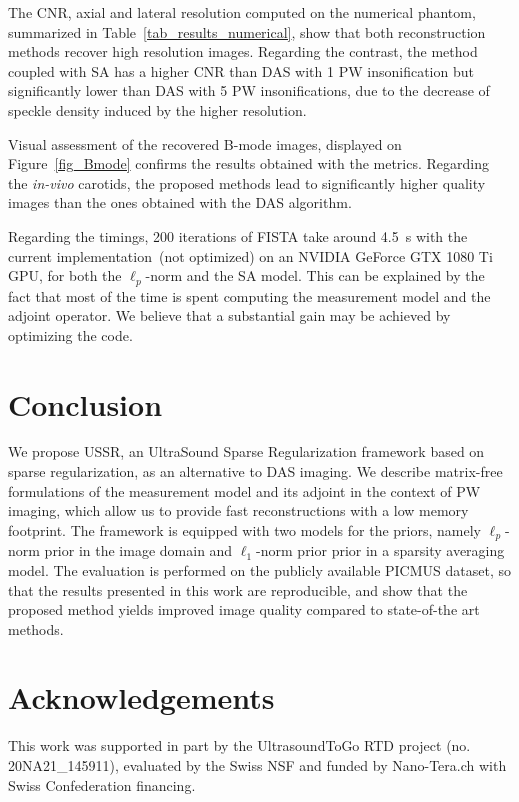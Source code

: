 \documentclass[conference]{IEEEtran}
\begin{document}
The CNR, axial and lateral resolution computed on the numerical phantom, summarized in Table~\ref{tab_results_numerical}, show that both reconstruction methods recover high resolution images. Regarding the contrast, the method coupled with SA has a higher CNR than DAS with \num{1} PW insonification but significantly lower than DAS with 5 PW insonifications, due to the decrease of speckle density induced by the higher resolution.

Visual assessment of the recovered B-mode images, displayed on Figure~\ref{fig_Bmode} confirms the results obtained with the metrics. Regarding the \textit{in-vivo} carotids, the proposed methods lead to significantly higher quality images than the ones obtained with the DAS algorithm.

Regarding the timings, \num{200} iterations of FISTA take around \SI{4.5}{\second} with the current implementation~(not optimized) on an NVIDIA GeForce GTX 1080 Ti GPU, for both the $\ell_p$-norm and the SA model. This can be explained by the fact that most of the time is spent computing the measurement model and the adjoint operator. We believe that a substantial gain may be achieved by optimizing the code.   
\section{Conclusion}
\label{sec_conclusion}
We propose USSR, an UltraSound Sparse Regularization framework based on sparse regularization, as an alternative to DAS imaging. We describe matrix-free formulations of the measurement model and its adjoint in the context of PW imaging, which allow us to provide fast reconstructions with a low memory footprint. The framework is equipped with two models for the priors, namely $\ell_p$-norm prior in the image domain and $\ell_1$-norm prior prior in a sparsity averaging model. The evaluation is performed on the publicly available PICMUS dataset, so that the results presented in this work are reproducible, and show that the proposed method yields improved image quality compared to state-of-the art methods. 

\section*{Acknowledgements}
This work was supported in part by the UltrasoundToGo RTD project (no. 20NA21\_145911), evaluated by the Swiss NSF and funded by Nano-Tera.ch with Swiss Confederation financing.
 


\end{document}
